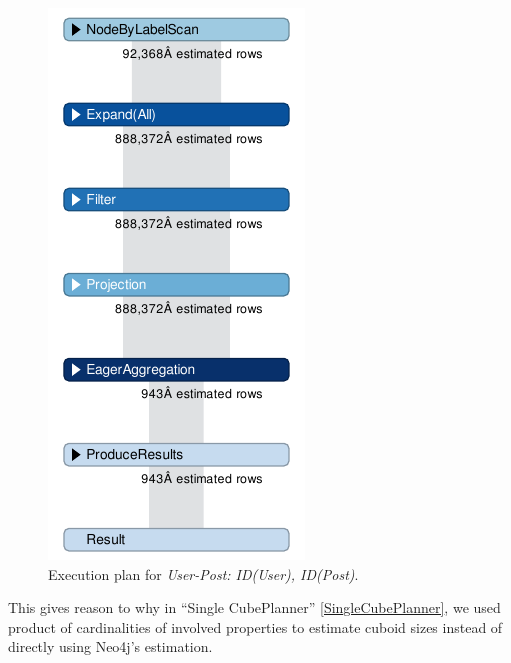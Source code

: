 \begin{figure}
\centering
\includegraphics[scale=0.7]{pic/wrong2}
\caption{Execution plan for \textit{User-Post: ID(User), ID(Post)}.}
\label{fig:wrong2}
\end{figure} 

This gives reason to why in ``Single CubePlanner'' \ref{SingleCubePlanner}, we used product of cardinalities of involved properties to estimate cuboid sizes instead of directly using Neo4j's estimation.
